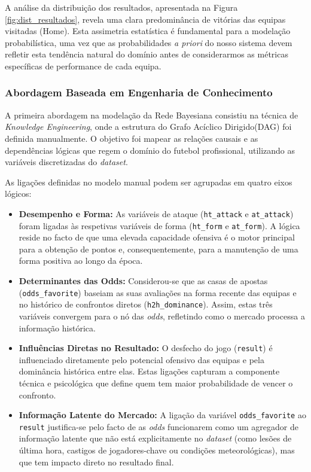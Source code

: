 \documentclass[10pt]{article}
\begin{document}
\noindent
A análise da distribuição dos resultados, apresentada na Figura \ref{fig:dist_resultados}, revela uma clara predominância de vitórias das equipas visitadas (Home). Esta assimetria estatística é fundamental para a modelação probabilística, uma vez que as probabilidades \textit{a priori} do nosso sistema devem refletir esta tendência natural do domínio antes de considerarmos as métricas específicas de performance de cada equipa.
\subsubsection{Abordagem Baseada em Engenharia de Conhecimento}
A primeira abordagem na modelação da Rede Bayesiana consistiu na técnica de \textit{Knowledge Engineering}, onde a estrutura do Grafo Acíclico Dirigido(DAG) foi definida manualmente. O objetivo foi mapear as relações causais e as dependências lógicas que regem o domínio do futebol profissional, utilizando as variáveis discretizadas do \textit{dataset}.

As ligações definidas no modelo manual podem ser agrupadas em quatro eixos lógicos:

\begin{itemize}
    \item \textbf{Desempenho e Forma:} As variáveis de ataque (\texttt{ht\_attack} e \texttt{at\_attack}) foram ligadas às respetivas variáveis de forma (\texttt{ht\_form} e \texttt{at\_form}). A lógica reside no facto de que uma elevada capacidade ofensiva é o motor principal para a obtenção de pontos e, consequentemente, para a manutenção de uma forma positiva ao longo da época.
    
    \item \textbf{Determinantes das Odds:} Considerou-se que as casas de apostas (\texttt{odds\_favorite}) baseiam as suas avaliações na forma recente das equipas e no histórico de confrontos diretos (\texttt{h2h\_dominance}). Assim, estas três variáveis convergem para o nó das \textit{odds}, refletindo como o mercado processa a informação histórica.
    
    \item \textbf{Influências Diretas no Resultado:} O desfecho do jogo (\texttt{result}) é influenciado diretamente pelo potencial ofensivo das equipas e pela dominância histórica entre elas. Estas ligações capturam a componente técnica e psicológica que define quem tem maior probabilidade de vencer o confronto.
    
    \item \textbf{Informação Latente do Mercado:} A ligação da variável \texttt{odds\_favorite} ao \texttt{result} justifica-se pelo facto de as \textit{odds} funcionarem como um agregador de informação latente que não está explicitamente no \textit{dataset} (como lesões de última hora, castigos de jogadores-chave ou condições meteorológicas), mas que tem impacto direto no resultado final.
\end{itemize}
\end{document}
